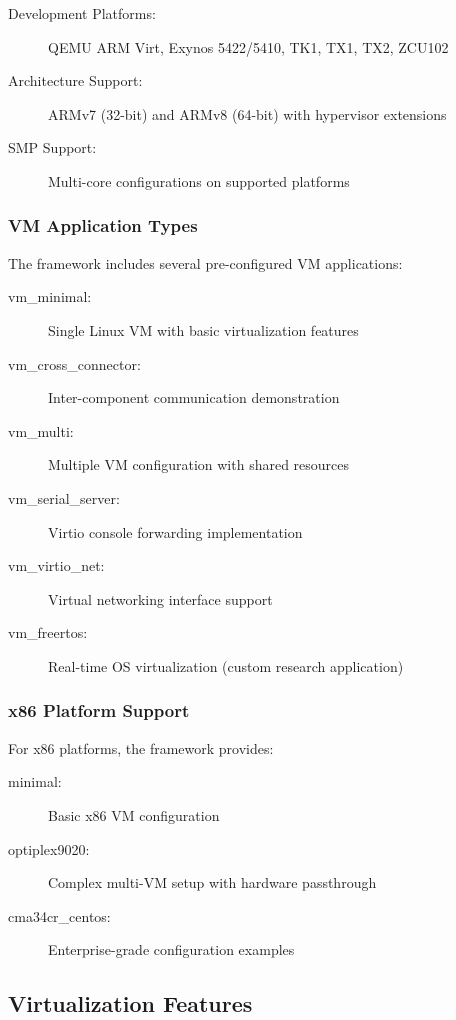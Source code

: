 \documentclass[11pt,a4paper]{article}
\begin{document}
\begin{description}
\item[Development Platforms:] QEMU ARM Virt, Exynos 5422/5410, TK1, TX1, TX2, ZCU102
\item[Architecture Support:] ARMv7 (32-bit) and ARMv8 (64-bit) with hypervisor extensions
\item[SMP Support:] Multi-core configurations on supported platforms
\end{description}

\subsubsection{VM Application Types}

The framework includes several pre-configured VM applications:

\begin{description}
\item[vm\_minimal:] Single Linux VM with basic virtualization features
\item[vm\_cross\_connector:] Inter-component communication demonstration
\item[vm\_multi:] Multiple VM configuration with shared resources
\item[vm\_serial\_server:] Virtio console forwarding implementation
\item[vm\_virtio\_net:] Virtual networking interface support
\item[vm\_freertos:] Real-time OS virtualization (custom research application)
\end{description}

\subsubsection{x86 Platform Support}

For x86 platforms, the framework provides:

\begin{description}
\item[minimal:] Basic x86 VM configuration
\item[optiplex9020:] Complex multi-VM setup with hardware passthrough
\item[cma34cr\_centos:] Enterprise-grade configuration examples
\end{description}

\subsection{Virtualization Features}
\end{document}
